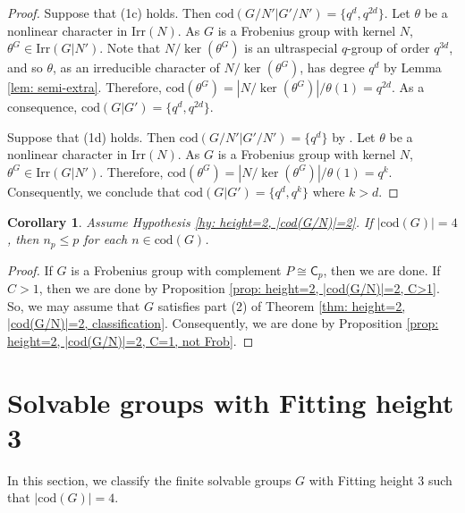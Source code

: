 \documentclass[9pt]{article}
\newtheorem{cor}[lem]{\bf Corollary}
\begin{document}
\begin{proof}
	

 


	
	Suppose that (1c) holds. 
	Then $\mathrm{cod}(G/N'|G'/N')=\{ q^{d},q^{2d} \}$.
	Let $\theta$ be a nonlinear character in $\mathrm{Irr}(N)$.
	As $G$ is a Frobenius group with kernel $N$, $\theta^{G}\in \mathrm{Irr}(G|N')$.
    Note that $N/\ker(\theta^G)$ is an ultraspecial $q$-group of order $q^{3d}$,
    and so $\theta$, as an irreducible character of $N/\ker(\theta^{G})$,
	has degree $q^{d}$ by Lemma \ref{lem: semi-extra}.
	Therefore, $\mathrm{cod}(\theta^{G})=|N/\ker(\theta^{G})|/\theta(1)=q^{2d}$.
	As a consequence, $\mathrm{cod}(G|G')=\{ q^{d},q^{2d} \}$.


	Suppose that (1d) holds.
	Then $\mathrm{cod}(G/N'|G'/N')=\{ q^{d} \}$ by \cite[Theorem A]{qian2023}.
	Let $\theta$ be a nonlinear character in $\mathrm{Irr}(N)$.
	As $G$ is a Frobenius group with kernel $N$, $\theta^{G}\in \mathrm{Irr}(G|N')$.
	Therefore, $\mathrm{cod}(\theta^{G})=|N/\ker(\theta^{G})|/\theta(1)=q^{k}$.
    Consequently, we conclude that $\mathrm{cod}(G|G')=\{ q^{d},q^{k} \}$ where $k>d$.	
\end{proof}







\begin{cor}\label{cor: height=2, |cod(G/N)|=2}
	Assume Hypothesis \ref{hy: height=2, |cod(G/N)|=2}.
	If $|\mathrm{cod}(G)|=4$, then $n_p\leq p$ for each $n\in \mathrm{cod}(G)$.
\end{cor}
\begin{proof}
	If $G$ is a Frobenius group with complement $P\cong \mathsf{C}_{p}$, then we are done.
	If $C>1$, then we are done by Proposition \ref{prop: height=2, |cod(G/N)|=2, C>1}.
	So, 
	we may assume that $G$ satisfies part (2) of Theorem \ref{thm: height=2, |cod(G/N)|=2, classification}.
	Consequently, we are done by Proposition \ref{prop: height=2, |cod(G/N)|=2, C=1, not Frob}.
\end{proof}



\section{Solvable groups with Fitting height 3}


In this section, we classify the finite solvable groups $G$ with Fitting height 3 such that $|\mathrm{cod}(G)|=4$.
\end{document}
